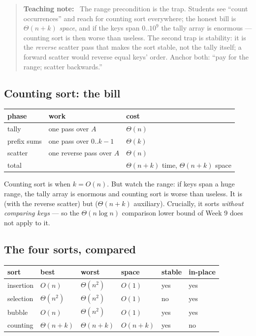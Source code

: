 \documentclass[11pt]{article}
\newenvironment{teachingaside}{\begin{quote}\small\color{primary-gold}\textbf{Teaching note:}\ }{\end{quote}}
\begin{document}
\begin{teachingaside}
The range precondition is the trap. Students see ``count occurrences'' and reach for counting sort everywhere; the honest bill is $\Theta(n+k)$ \emph{space}, and if the keys span $0..10^9$ the tally array is enormous --- counting sort is then worse than useless. The second trap is stability: it is the \emph{reverse} scatter pass that makes the sort stable, not the tally itself; a forward scatter would reverse equal keys' order. Anchor both: ``pay for the range; scatter backwards.''
\end{teachingaside}

\subsection{Counting sort: the bill}

\begin{center}
{\footnotesize
\begin{tabular}{lll}
  \toprule
  \textbf{phase} & \textbf{work} & \textbf{cost} \\
  \midrule
  tally & one pass over $A$ & $\Theta(n)$ \\
  prefix sums & one pass over $0..k-1$ & $\Theta(k)$ \\
  scatter & one reverse pass over $A$ & $\Theta(n)$ \\
  \midrule
  total & & $\Theta(n + k)$ time, $\Theta(n + k)$ space \\
  \bottomrule
\end{tabular}}
\end{center}

Counting sort is  when $k = O(n)$. But watch the range: if keys span a huge range, the tally array is enormous and counting sort is worse than useless. It is  (with the reverse scatter) but  ($\Theta(n + k)$ auxiliary). Crucially, it sorts \emph{without comparing keys} --- so the $\Theta(n \log n)$ comparison lower bound of Week 9 does not apply to it.

\subsection{The four sorts, compared}

\begin{center}
{\footnotesize
\begin{tabular}{llllll}
  \toprule
  \textbf{sort} & \textbf{best} & \textbf{worst} & \textbf{space} &
    \textbf{stable} & \textbf{in-place} \\
  \midrule
  insertion & $O(n)$ & $\Theta(n^2)$ & $O(1)$ & yes & yes \\
  selection & $\Theta(n^2)$ & $\Theta(n^2)$ & $O(1)$ & no & yes \\
  bubble & $O(n)$ & $\Theta(n^2)$ & $O(1)$ & yes & yes \\
  counting & $\Theta(n+k)$ & $\Theta(n+k)$ & $O(n+k)$ & yes & no \\
  \bottomrule
\end{tabular}}
\end{center}
\end{document}

